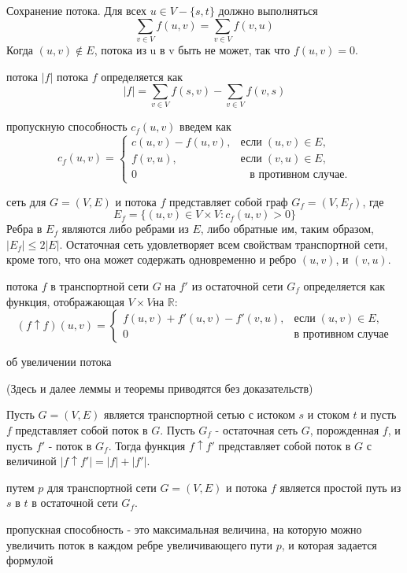 \documentclass[12pt]{article}
\begin{document}
	Сохранение потока. Для всех $u \in V - \{s, t\}$ должно выполняться
	$$ \sum_{v \in V}{f(u,v)} = \sum_{v \in V}{f(v,u)} $$
	Когда $(u, v) \notin E$, потока из u в v быть не может, так что $f(u,v) = 0$.
	\par{ потока} $|f|$ потока $f$ определяется как
	$$ |f| = \sum_{v \in V}{f(s,v)} - \sum_{v \in V}{f(v,s)} $$
	\newpage
	\par { пропускную способность}  $c_f(u,v)$ введем как
	$$ c_f(u,v) =  
	\left\{
		\begin{array}{rcl}
		c(u,v) - f(u,v), & \mbox{если} \; (u,v) \in E, \\
		f(v,u), & \mbox{если} \; (v,u) \in E, \\
		0 & \;\;\; \mbox{в противном случае.}
		\end{array}
	\right.  $$
	\par{ сеть} для $G = (V, E)$ и потока $f$ представляет собой граф $G_f = (V, E_f)$, где
	$$ E_f = \{(u,v) \in V \times V : c_f(u,v) > 0\}$$\newline
	Ребра в $E_f$ являются либо ребрами из $E$, либо обратные им, таким образом, $|E_f| \le 2|E|$. Остаточная сеть удовлетворяет всем свойствам транспортной сети, кроме того, что она может содержать одновременно и ребро $(u,v)$, и $(v, u)$.
	\par{ потока} $f$ в транспортной сети $G$ на $f'$ из остаточной сети  $G_f$ определяется как функция, отображающая $V \times V \mbox{на } \mathbb{R}$:
	$$ (f \uparrow f)(u,v) =
	\left\{
		\begin{array}{rcl}
			f(u,v) + f'(u,v) - f'(v,u), & \mbox{если} \; (u,v) \in E, \\
			0 & \mbox{в противном случае}
		\end{array}
	 \right. $$
	 \par { об увеличении потока}
	 \par (Здесь и далее леммы и теоремы приводятся без доказательств)
	 \par Пусть $G = (V, E)$ является транспортной сетью с истоком $s$ и стоком $t$ и пусть $f$ представляет собой поток в $G$. Пусть $G_f$ - остаточная сеть $G$, порожденная $f$, и пусть $f'$ - поток в $G_f$. Тогда функция $f \uparrow f'$ представляет собой поток в $G$ с величиной $|f \uparrow f'| = |f| + |f'|$.
	\par{ путем} $p$ для транспортной сети $G = (V, E)$ и потока $f$ является простой путь из $s$ в $t$ в остаточной сети $G_f$.
	\par{ пропускная способность} -  это максимальная величина, на которую можно увеличить поток в каждом ребре увеличивающего пути $p$, и которая задается формулой
\end{document}
